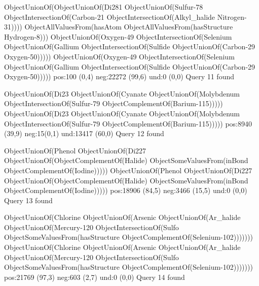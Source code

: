 ObjectUnionOf(ObjectUnionOf(Di281 ObjectUnionOf(Sulfur-78 ObjectIntersectionOf(Carbon-21 ObjectIntersectionOf(Alkyl_halide Nitrogen-31)))) ObjectAllValuesFrom(hasAtom ObjectAllValuesFrom(hasStructure Hydrogen-8)))
ObjectUnionOf(Oxygen-49 ObjectIntersectionOf(Selenium ObjectUnionOf(Gallium ObjectIntersectionOf(Sulfide ObjectUnionOf(Carbon-29 Oxygen-50)))))
ObjectUnionOf(Oxygen-49 ObjectIntersectionOf(Selenium ObjectUnionOf(Gallium ObjectIntersectionOf(Sulfide ObjectUnionOf(Carbon-29 Oxygen-50)))))
pos:100 (0,4)		 neg:22272 (99,6)		 und:0 (0,0)
Query 11 found

ObjectUnionOf(Di23 ObjectUnionOf(Cyanate ObjectUnionOf(Molybdenum ObjectIntersectionOf(Sulfur-79 ObjectComplementOf(Barium-115)))))
ObjectUnionOf(Di23 ObjectUnionOf(Cyanate ObjectUnionOf(Molybdenum ObjectIntersectionOf(Sulfur-79 ObjectComplementOf(Barium-115)))))
pos:8940 (39,9)		 neg:15(0,1)		 und:13417 (60,0)
Query 12 found

ObjectUnionOf(Phenol ObjectUnionOf(Di227 ObjectUnionOf(ObjectComplementOf(Halide) ObjectSomeValuesFrom(inBond ObjectComplementOf(Iodine)))))
ObjectUnionOf(Phenol ObjectUnionOf(Di227 ObjectUnionOf(ObjectComplementOf(Halide) ObjectSomeValuesFrom(inBond ObjectComplementOf(Iodine)))))
pos:18906 (84,5)		 neg:3466 (15,5)		 und:0 (0,0)
Query 13 found

ObjectUnionOf(Chlorine ObjectUnionOf(Arsenic ObjectUnionOf(Ar_halide ObjectUnionOf(Mercury-120 ObjectIntersectionOf(Sulfo ObjectSomeValuesFrom(hasStructure ObjectComplementOf(Selenium-102)))))))
ObjectUnionOf(Chlorine ObjectUnionOf(Arsenic ObjectUnionOf(Ar_halide ObjectUnionOf(Mercury-120 ObjectIntersectionOf(Sulfo ObjectSomeValuesFrom(hasStructure ObjectComplementOf(Selenium-102)))))))
pos:21769 (97,3)		 neg:603 (2,7)		 und:0 (0,0)
Query 14 found